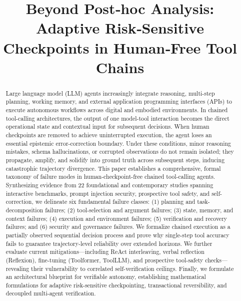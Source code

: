 \documentclass[conference]{IEEEtran}
\begin{document}
\title{Beyond Post‑hoc Analysis: Adaptive Risk‑Sensitive Checkpoints in Human‑Free Tool Chains}

\author{
}

\maketitle

\begin{abstract}
Large language model (LLM) agents increasingly integrate reasoning, multi-step planning, working memory, and external application programming interfaces (APIs) to execute autonomous workflows across digital and embodied environments. In chained tool-calling architectures, the output of one model-tool interaction becomes the direct operational state and contextual input for subsequent decisions. When human checkpoints are removed to achieve uninterrupted execution, the agent loses an essential epistemic error-correction boundary. Under these conditions, minor reasoning mistakes, schema hallucinations, or corrupted observations do not remain isolated; they propagate, amplify, and solidify into ground truth across subsequent steps, inducing catastrophic trajectory divergence. This paper establishes a comprehensive, formal taxonomy of failure modes in human-checkpoint-free chained tool-calling agents. Synthesizing evidence from 22 foundational and contemporary studies spanning interactive benchmarks, prompt injection security, prospective tool safety, and self-correction, we delineate six fundamental failure classes: (1) planning and task-decomposition failures; (2) tool-selection and argument failures; (3) state, memory, and context failures; (4) execution and environment failures; (5) verification and recovery failures; and (6) security and governance failures. We formalize chained execution as a partially observed sequential decision process and prove why single-step tool accuracy fails to guarantee trajectory-level reliability over extended horizons. We further evaluate current mitigations---including ReAct interleaving, verbal reflection (Reflexion), fine-tuning (Toolformer, ToolLLM), and prospective tool-safety checks---revealing their vulnerability to correlated self-verification ceilings. Finally, we formulate an architectural blueprint for verifiable autonomy, establishing mathematical formulations for adaptive risk-sensitive checkpointing, transactional reversibility, and decoupled multi-agent verification.
\end{abstract}
\end{document}

